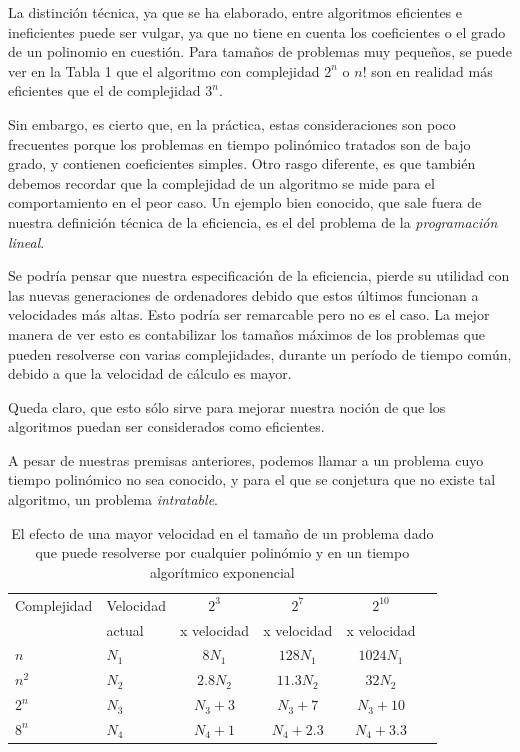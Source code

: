 \documentclass[10pt,a5paper]{book}
\begin{document}
La distinción técnica, ya que se ha elaborado, entre algoritmos eficientes e ineficientes puede ser vulgar, ya que no tiene en cuenta los coeficientes o el grado de un polinomio en cuestión. Para tamaños de problemas muy pequeños, se puede ver en la Tabla 1 que el algoritmo con complejidad $2^n$ o $n!$ son en realidad más eficientes que el de complejidad $3^n$.

Sin embargo, es cierto que, en la práctica, estas consideraciones son poco frecuentes porque los problemas en tiempo polinómico tratados son de bajo grado, y contienen coeficientes simples. Otro rasgo diferente, es que también debemos recordar que la complejidad de un algoritmo se mide para el comportamiento en el peor caso. Un ejemplo bien conocido, que sale fuera de nuestra definición técnica de la eficiencia, es el del problema de la \emph{programación lineal}.

Se podría pensar que nuestra especificación de la eficiencia, pierde su utilidad con las nuevas generaciones de ordenadores debido que estos últimos funcionan a velocidades más altas. Esto podría ser remarcable pero no es el caso. La mejor manera de ver esto es contabilizar los tamaños máximos de los problemas que pueden resolverse con varias complejidades, durante un período de tiempo común, debido a que la velocidad de cálculo es mayor.

Queda claro, que esto sólo sirve para mejorar nuestra noción de que los algoritmos puedan ser considerados como eficientes.

A pesar de nuestras premisas anteriores, podemos llamar a un problema cuyo tiempo polinómico no sea conocido, y para el que se conjetura que no existe tal algoritmo, un problema \emph{intratable}.
\begin{center}
\begin{table}
  \caption{El efecto de una mayor velocidad en el tamaño de un problema dado que puede resolverse por cualquier polinómio y en un tiempo algorítmico exponencial}
    \begin{tabular}{p{1.9cm}l c c c c}
      \hline
      \hline
      Complejidad & Velocidad & $2^3$ & $2^7$ & $2^{10}$ \\
      & actual & x velocidad & x velocidad & x velocidad \\
      \hline
      $n$ & $N_1$ & $8N_1$ & $128N_1$ & $1024N_1$ \\
      $n^2$ & $N_2$ & $2.8N_2$ & $11.3N_2$ & $32N_2$ \\
      $2^n$ & $N_3$ & $N_3 + 3$ & $N_3 + 7$ & $N_3 + 10$ \\
      $8^n$ & $N_4$ & $N_4 + 1$ & $N_4 + 2.3$ & $N_4 + 3.3$ \\
      \hline
      \hline
    \end{tabular}
\end{table}
\end{center}      
\end{document}

